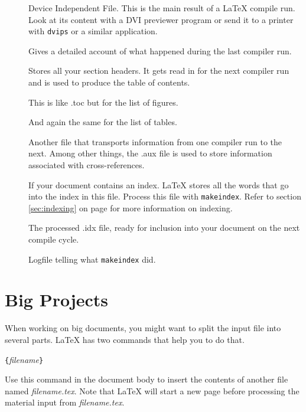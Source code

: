 \begin{description}
\item[] Device Independent File. This is the main result of a \LaTeX{}
  compile run. Look at its content with a DVI previewer
  program or send it to a printer with \texttt{dvips} or a
  similar application.
\item[] Gives a detailed account of what happened during the
  last compiler run.
\item[] Stores all your section headers. It gets read in for the
  next compiler run and is used to produce the table of contents.
\item[] This is like .toc but for the list of figures.
\item[] And again the same for the list of tables.
\item[] Another file that transports information from one
  compiler run to the next. Among other things, the .aux file is used
  to store information associated with cross-references.
\item[] If your document contains an index. \LaTeX{} stores all
  the words that go into the index in this file. Process this file with
  \texttt{makeindex}. Refer to section \ref{sec:indexing} on
  page \pageref{sec:indexing} for more information on indexing.
\item[] The processed .idx file, ready for inclusion into your
  document on the next compile cycle.
\item[] Logfile telling what \texttt{makeindex} did.
\end{description}


%
%



%

\section{Big Projects}
When working on big documents, you might want to split the input file
into several parts. \LaTeX{} has two commands that help you to do
that.

\begin{lscommand}
\verb|{|\emph{filename}\verb|}|
\end{lscommand}
\noindent Use this command in the document body to insert the
contents of another file named \emph{filename.tex}. Note that \LaTeX{}
will start a new page
before processing the material input from \emph{filename.tex}.

